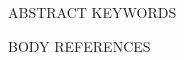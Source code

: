 \documentclass[sigconf]{acmart}
{{PACKAGES}}
\begin{document}
{{ABSTRACT}}
{{KEYWORDS}}
\maketitle
{{BODY}}
{{REFERENCES}}
\end{document}
